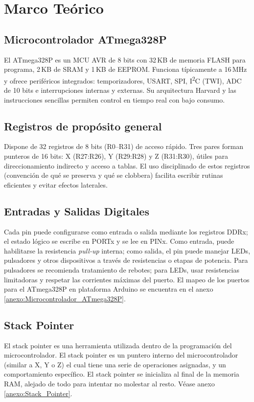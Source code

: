 \section{Marco Teórico}

\subsection{Microcontrolador ATmega328P}
El ATmega328P es un MCU AVR de 8 bits con 32\,KB de memoria FLASH para programa, 2\,KB de SRAM y 1\,KB de EEPROM. Funciona típicamente a 16\,MHz y ofrece periféricos integrados: temporizadores, USART, SPI, I\textsuperscript{2}C (TWI), ADC de 10 bits e interrupciones internas y externas. Su arquitectura Harvard y las instrucciones sencillas permiten control en tiempo real con bajo consumo. 

\subsection{Registros de propósito general}
Dispone de 32 registros de 8 bits (R0–R31) de acceso rápido. Tres pares forman punteros de 16 bits: X (R27:R26), Y (R29:R28) y Z (R31:R30), útiles para direccionamiento indirecto y acceso a tablas. El uso disciplinado de estos registros (convención de qué se preserva y qué se clobbera) facilita escribir rutinas eficientes y evitar efectos laterales.

\subsection{Entradas y Salidas Digitales}
Cada pin puede configurarse como entrada o salida mediante los registros DDRx; el estado lógico se escribe en PORTx y se lee en PINx. Como entrada, puede habilitarse la resistencia \textit{pull-up} interna; como salida, el pin puede manejar LEDs, pulsadores y otros dispositivos a través de resistencias o etapas de potencia. Para pulsadores se recomienda tratamiento de rebotes; para LEDs, usar resistencias limitadoras y respetar las corrientes máximas del puerto. El mapeo de los puertos para el ATmega328P en plataforma Arduino se encuentra en el anexo \ref{anexo:Microcontrolador_ATmega328P}.


\subsection{Stack Pointer}
El stack pointer es una herramienta utilizada dentro de la programación del microcontrolador. El stack pointer es un puntero interno del microcontrolador (similar a X, Y o Z) el cual tiene una serie de operaciones asignadas, y un comportamiento específico. El stack pointer se inicializa al final de la memoria RAM, alejado de todo para intentar no molestar al resto. Véase anexo \ref{anexo:Stack_Pointer}.

